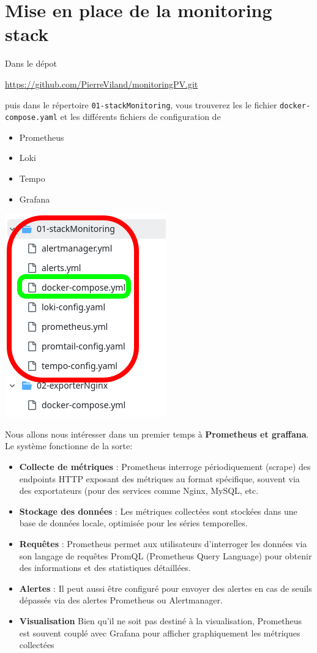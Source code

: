 \documentclass[french, 12pt]{article}%
\newcommand{\itemE}{\item[$\bullet$]}
\begin{document}
\section{Mise en place de la monitoring stack}
\begin{minipage}{0.6\linewidth}
Dans le dépot 

\href{https://github.com/PierreViland/monitoringPV.git}{https://github.com/PierreViland/monitoringPV.git} 

puis dans le répertoire \verb?01-stackMonitoring?, vous trouverez les le fichier \verb?docker-compose.yaml? et les différents fichiers de configuration de 
\begin{itemize}
\itemE Prometheus
\itemE Loki
\itemE Tempo
\itemE Grafana 
\end{itemize}
\end{minipage}
\begin{minipage}{0.39\linewidth}

\begin{center}
\includegraphics[scale=0.5]{./ressource/depo_global}
\end{center}
\end{minipage}



\vspace{0.5cm}

Nous allons nous intéresser dans un premier temps à \textbf{Prometheus et graffana}. Le système fonctionne de la sorte:
\begin{itemize}
\itemE \textbf{Collecte de métriques} : Prometheus interroge périodiquement (scrape) des endpoints HTTP exposant des métriques au format spécifique, souvent via des exportateurs (pour des services comme Nginx, MySQL, etc.
\itemE \textbf{Stockage des données} : Les métriques collectées sont stockées dans une base de données locale, optimisée pour les séries temporelles.
\itemE \textbf{Requêtes} : Prometheus permet aux utilisateurs d’interroger les données via son langage de requêtes PromQL (Prometheus Query Language) pour obtenir des informations et des statistiques détaillées.
\itemE \textbf{Alertes } : Il peut aussi être configuré pour envoyer des alertes en cas de seuils dépassés via des alertes Prometheus ou Alertmanager.
\itemE \textbf{Visualisation } Bien qu’il ne soit pas destiné à la visualisation, Prometheus est souvent couplé avec Grafana pour afficher graphiquement les métriques collectées
\end{itemize} 
\end{document}
